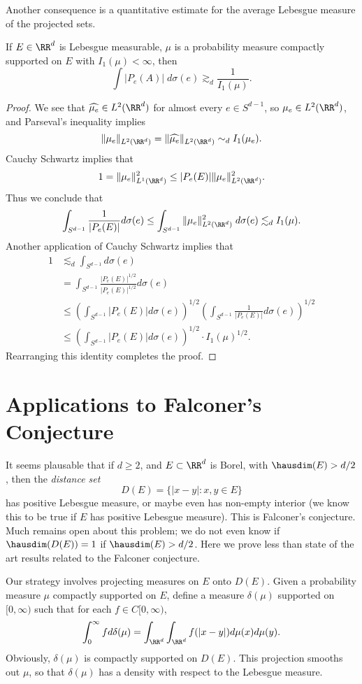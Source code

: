 Another consequence is a quantitative estimate for the average Lebesgue measure of the projected sets.

\begin{theorem}
	If $E \in \RR^d$ is Lebesgue measurable, $\mu$ is a probability measure compactly supported on $E$ with $I_1(\mu) < \infty$, then
	\[ \int |P_e(A)|\; d\sigma(e) \gtrsim_d \frac{1}{I_1(\mu)}. \]
\end{theorem}
\begin{proof}
	We see that $\widehat{\mu_e} \in L^2(\RR^d)$ for almost every $e \in S^{d-1}$, so $\mu_e \in L^2(\RR^d)$, and Parseval's inequality implies
	\[ \| \mu_e \|_{L^2(\RR^d)} = \| \widehat{\mu_e} \|_{L^2(\RR^d)} \sim_d I_1(\mu_e). \]
	Cauchy Schwartz implies that
	\[ 1 = \| \mu_e \|_{L^1(\RR^d)}^2 \leq |P_e(E)| \| \mu_e \|_{L^2(\RR^d)}^2. \]
	Thus we conclude that
	\[ \int_{S^{d-1}} \frac{1}{|P_e(E)|} d\sigma(e) \leq \int_{S^{d-1}} \| \mu_e \|_{L^2(\RR^d)}^2\; d\sigma(e) \lesssim_d I_1(\mu). \]
	Another application of Cauchy Schwartz implies that
	\begin{align*}
		1 &\lesssim_d \int_{S^{d-1}} d\sigma(e)\\
		&= \int_{S^{d-1}} \frac{|P_e(E)|^{1/2}}{|P_e(E)|^{1/2}} d\sigma(e)\\
		&\leq \left( \int_{S^{d-1}} |P_e(E)| d\sigma(e) \right)^{1/2} \left( \int_{S^{d-1}} \frac{1}{|P_e(E)|} d\sigma(e) \right)^{1/2}\\
		&\leq \left( \int_{S^{d-1}} |P_e(E)| d\sigma(e) \right)^{1/2} \cdot I_1(\mu)^{1/2}.
	\end{align*}
	Rearranging this identity completes the proof.
\end{proof}

\section{Applications to Falconer's Conjecture}

It seems plausable that if $d \geq 2$, and $E \subset \RR^d$ is Borel, with $\hausdim(E) > d/2$, then the \emph{distance set}
%
\[ D(E) = \{ |x - y|: x,y \in E \} \]
%
has positive Lebesgue measure, or maybe even has non-empty interior (we know this to be true if $E$ has positive Lebesgue measure). This is Falconer's conjecture. Much remains open about this problem; we do not even know if $\hausdim(D(E)) = 1$ if $\hausdim(E) > d/2$. Here we prove less than state of the art results related to the Falconer conjecture.

Our strategy involves projecting measures on $E$ onto $D(E)$. Given a probability measure $\mu$ compactly supported on $E$, define a measure $\delta(\mu)$ supported on $[0,\infty)$ such that for each $f \in C[0,\infty)$,
%
\[ \int_0^\infty f d\delta(\mu) = \int_{\RR^d} \int_{\RR^d} f(|x - y|) d\mu(x) d\mu(y). \]
%
Obviously, $\delta(\mu)$ is compactly supported on $D(E)$. This projection smooths out $\mu$, so that $\delta(\mu)$ has a density with respect to the Lebesgue measure.

